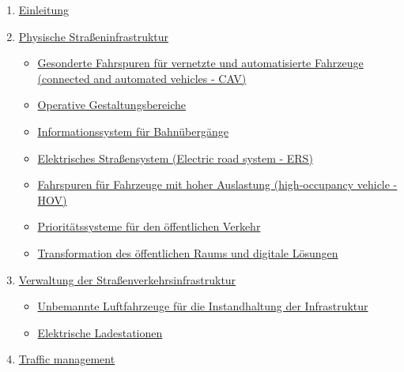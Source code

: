 \documentclass[
]{book}
\providecommand{\tightlist}{%
  \setlength{\itemsep}{0pt}\setlength{\parskip}{0pt}}
\begin{document}
\begin{enumerate}
\def\labelenumi{\arabic{enumi}.}
\tightlist
\item
  \protect\hyperlink{intro}{Einleitung}
\item
  \protect\hyperlink{infrastructure}{Physische Straßeninfrastruktur}

  \begin{itemize}
  \tightlist
  \item
    \protect\hyperlink{dedicated_lanes}{Gesonderte Fahrspuren für vernetzte und automatisierte Fahrzeuge (connected and automated vehicles - CAV)}\\
  \item
    \protect\hyperlink{ODD}{Operative Gestaltungsbereiche}\\
  \item
    \protect\hyperlink{rail_crossing_info_system}{Informationssystem für Bahnübergänge}\\
  \item
    \protect\hyperlink{ers}{Elektrisches Straßensystem (Electric road system - ERS)}\\
  \item
    \protect\hyperlink{high_occupancy}{Fahrspuren für Fahrzeuge mit hoher Auslastung (high-occupancy vehicle - HOV)}\\
  \item
    \protect\hyperlink{public_trans_priority}{Prioritätssysteme für den öffentlichen Verkehr}\\
  \item
    \protect\hyperlink{transformation_public_space}{Transformation des öffentlichen Raums und digitale Lösungen}\\
  \end{itemize}
\item
  \protect\hyperlink{highway}{Verwaltung der Straßenverkehrsinfrastruktur}

  \begin{itemize}
  \tightlist
  \item
    \protect\hyperlink{uav}{Unbemannte Luftfahrzeuge für die Instandhaltung der Infrastruktur}\\
  \item
    \protect\hyperlink{charging_station}{Elektrische Ladestationen}\\
  \end{itemize}
\item
  \protect\hyperlink{traffic}{Traffic management}


\end{enumerate}
\end{document}

